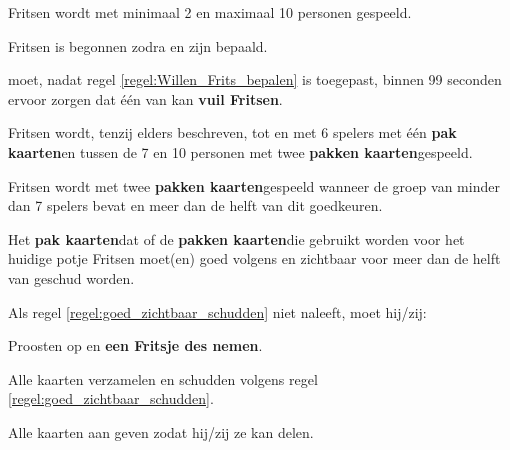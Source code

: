 \newpage
{}
\label{sec:beginfase_start}


\vervolgLijst{}
    \item Fritsen wordt met minimaal 2 en maximaal 10 personen gespeeld.
\eindLijst{}

\vervolgLijst{}
    \item Fritsen is begonnen zodra \Frits en \Willem zijn bepaald.
    \label{regel:Willen_Frits_bepalen}
\eindLijst{}

\vervolgLijst{}
    \item \Frits moet, nadat regel \ref{regel:Willen_Frits_bepalen} is toegepast, binnen 99 seconden ervoor zorgen dat één van \alleSpelers kan \textbf{vuil Fritsen}.
\eindLijst{}


\vervolgLijst{}
    \item Fritsen wordt, tenzij elders beschreven, tot en met 6 spelers met één \textbf{pak kaarten}\footnotemark[1] en tussen de 7 en 10 personen met twee \textbf{pakken kaarten}\footnotemark[1] gespeeld.
\eindLijst{}

\vervolgLijst{}
    \item Fritsen wordt met twee \textbf{pakken kaarten}\footnotemark[1] gespeeld wanneer de groep van \alleSpelers minder dan 7 spelers bevat en meer dan de helft van \alleSpelers dit goedkeuren. 
\eindLijst{}

\vervolgLijst{}
    \item Het \textbf{pak kaarten}\footnotemark[1] dat of de \textbf{pakken kaarten}\footnotemark[1] die gebruikt worden voor het huidige potje Fritsen moet(en) goed volgens en zichtbaar voor meer dan de helft van \alleSpelers geschud worden.
    \label{regel:goed_zichtbaar_schudden}
\eindLijst{}

\vervolgLijst{}
    \item Als \eenSpeler regel \ref{regel:goed_zichtbaar_schudden} niet naleeft, moet hij/zij:
    \puntLijst{}
        \item Proosten op  en \textbf{een Fritsje des nemen}\footnotemark[2].
        \item Alle kaarten verzamelen en schudden volgens regel \ref{regel:goed_zichtbaar_schudden}.
        \item Alle kaarten aan \Frits geven zodat hij/zij ze kan delen.
    \eindPuntLijst{}
\eindLijst{}

